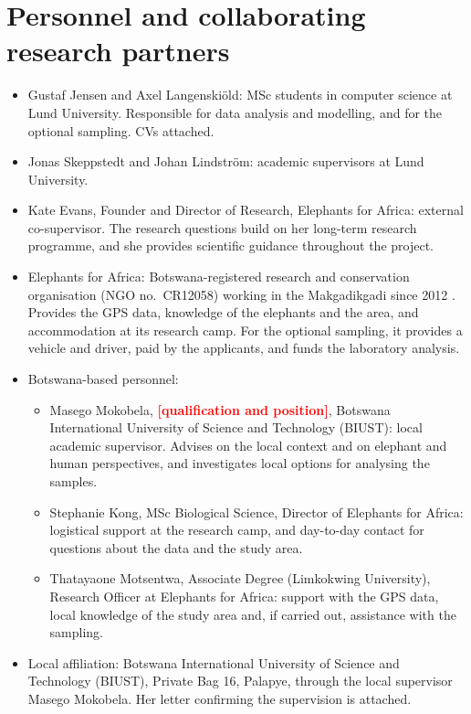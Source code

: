 \documentclass[12pt,a4paper]{article}
\newcommand{\todo}[1]{\textcolor{red}{\textbf{[#1]}}}
\begin{document}
\section{Personnel and collaborating research partners}
\begin{itemize}
\item Gustaf Jensen and Axel Langenskiöld: MSc students in computer science at Lund University. Responsible for data analysis and modelling, and for the optional sampling. CVs attached.
\item Jonas Skeppstedt and Johan Lindström: academic supervisors at Lund University.
\item Kate Evans, Founder and Director of Research, Elephants for Africa: external co-supervisor. The research questions build on her long-term research programme, and she provides scientific guidance throughout the project.
\item Elephants for Africa: Botswana-registered research and conservation organisation (NGO no.\ CR12058) working in the Makgadikgadi since 2012 \cite{evans2019}. Provides the GPS data, knowledge of the elephants and the area, and accommodation at its research camp. For the optional sampling, it provides a vehicle and driver, paid by the applicants, and funds the laboratory analysis.
\item Botswana-based personnel:
  \begin{itemize}
  \item[--] Masego Mokobela, \todo{qualification and position}, Botswana International University of Science and Technology (BIUST): local academic supervisor. Advises on the local context and on elephant and human perspectives, and investigates local options for analysing the samples.
  \item[--] Stephanie Kong, MSc Biological Science, Director of Elephants for Africa: logistical support at the research camp, and day-to-day contact for questions about the data and the study area.
  \item[--] Thatayaone Motsentwa, Associate Degree (Limkokwing University), Research Officer at Elephants for Africa: support with the GPS data, local knowledge of the study area and, if carried out, assistance with the sampling.
  \end{itemize}
\item Local affiliation: Botswana International University of Science and Technology (BIUST), Private Bag 16, Palapye, through the local supervisor Masego Mokobela. Her letter confirming the supervision is attached.
\end{itemize}
\end{document}
